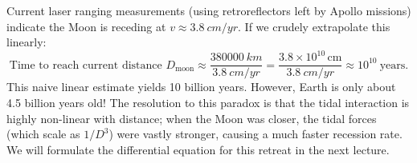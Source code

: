 Current laser ranging measurements (using retroreflectors left by Apollo missions) indicate the Moon is receding at $v \approx \SI{3.8}{cm/yr}$. If we crudely extrapolate this linearly:
\[
    \text{Time to reach current distance } D_\text{moon} \approx \frac{\SI{380000}{km}}{\SI{3.8}{cm/yr}} = \frac{3.8 \times 10^{10}\,\text{cm}}{\SI{3.8}{cm/yr}} \approx 10^{10}\ \text{years}.
\]
This naive linear estimate yields 10 billion years. However, Earth is only about 4.5 billion years old! The resolution to this paradox is that the tidal interaction is highly non-linear with distance; when the Moon was closer, the tidal forces (which scale as $1/D^3$) were vastly stronger, causing a much faster recession rate. We will formulate the differential equation for this retreat in the next lecture.
